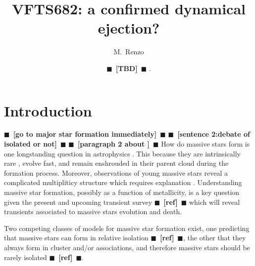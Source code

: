 \documentclass{aa}
\newcommand{\todo}[1]{{\large $\blacksquare$~\textbf{\color{red}[#1]}}~$\blacksquare$}
\begin{document}
\title{VFTS682: a confirmed dynamical ejection?}

\author{M.~Renzo \and \todo{TBD}%
  .} 

  
\date{}
\abstract{}

\maketitle{}

\section{Introduction}
\label{sec:intro}
\todo{go to major star formation immediately}
\todo{sentence 2:debate of isolated or not}
\todo{paragraph 2 about }
How do massive stars form is one longstanding question in astrophysics
\cite{lada:03, zinnecker:07}. This because they are intrinsically rare
\citep[e.g.,][]{salpeter:55,kroupa:01, schneider:18}, evolve fast, and
remain enshrouded in their parent cloud during the formation
process. Moreover, observations of young massive stars reveal a
complicated multipliticy structure which requires
explanation \citep[][]{sana:12,sana:17}. Understanding massive star formation, possibly as a
function of metallicity, is a key question given the present and upcoming
transient survey \citep[e.g., LSST, BlackGem, LIGO/Virgo O3][]{}\todo{ref} which
will reveal transients associated to massive stars
evolution and death.

Two competing classes of models for massive star formation exist, one predicting 
that massive stars can form in relative isolation \todo{ref}, the other that
they always form in cluster and/or associations, and therefore massive
stars should be rarely isolated \todo{ref}.
\end{document}
